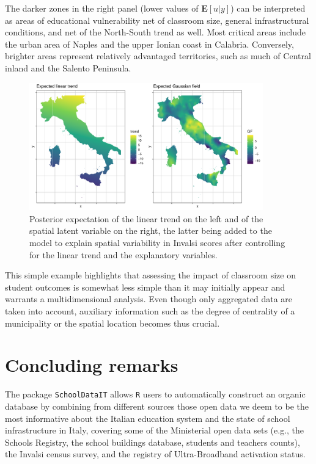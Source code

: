 \documentclass[openany]{book}
\begin{document}
The darker zones in the right panel (lower values of $\mathbf{E}[u|y]$) can be interpreted as areas of educational vulnerability net of classroom size, general infrastructural conditions, and net of the North-South trend as well. Most critical areas include the urban area of Naples and the upper Ionian coast in Calabria. Conversely, brighter areas represent relatively advantaged territories, such as much of  Central inland and the Salento Peninsula.

\begin{figure}
  \centering
  \includegraphics[width = 0.9\textwidth]{SchoolDataIT/Fig8.pdf} 
  \caption{Posterior expectation of the linear trend on the left and of the spatial latent variable on the right, the latter being added to the model to explain spatial variability in Invalsi scores after controlling for the linear trend and the explanatory variables.}
  \label{fig:trends}
\end{figure}


This simple example highlights that assessing the impact of classroom size on student outcomes is somewhat less simple than it may initially appear and warrants a multidimensional analysis. Even though only aggregated data are taken into account, auxiliary information such as the degree of centrality of a municipality or the spatial location becomes thus crucial.





\section{Concluding remarks}
The package \texttt{SchoolDataIT} allows \texttt{R} users to automatically construct an organic database by combining from different sources those open data we deem to be the most informative about the Italian education system and the state of school infrastructure in Italy, covering some of the Ministerial open data sets (e.g., the Schools Registry, the school buildings database, students and teachers counts), the Invalsi census survey, and the registry of Ultra-Broadband activation status. 
\end{document}
